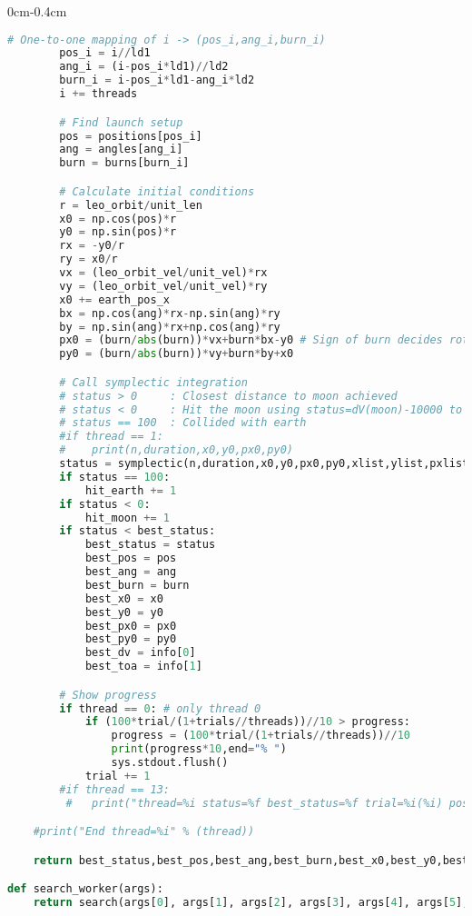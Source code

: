 \begin{adjustwidth*}{0cm}{-0.4cm}
\begin{lstlisting}[language=Python]
        # One-to-one mapping of i -> (pos_i,ang_i,burn_i)
        pos_i = i//ld1
        ang_i = (i-pos_i*ld1)//ld2
        burn_i = i-pos_i*ld1-ang_i*ld2
        i += threads

        # Find launch setup
        pos = positions[pos_i]
        ang = angles[ang_i]
        burn = burns[burn_i]

        # Calculate initial conditions
        r = leo_orbit/unit_len
        x0 = np.cos(pos)*r
        y0 = np.sin(pos)*r
        rx = -y0/r
        ry = x0/r
        vx = (leo_orbit_vel/unit_vel)*rx
        vy = (leo_orbit_vel/unit_vel)*ry
        x0 += earth_pos_x
        bx = np.cos(ang)*rx-np.sin(ang)*ry
        by = np.sin(ang)*rx+np.cos(ang)*ry
        px0 = (burn/abs(burn))*vx+burn*bx-y0 # Sign of burn decides rotational direction of launch
        py0 = (burn/abs(burn))*vy+burn*by+x0

        # Call symplectic integration
        # status > 0     : Closest distance to moon achieved 
        # status < 0     : Hit the moon using status=dV(moon)-10000 to get into orbit
        # status == 100  : Collided with earth
        #if thread == 1:
        #    print(n,duration,x0,y0,px0,py0)
        status = symplectic(n,duration,x0,y0,px0,py0,xlist,ylist,pxlist,pylist,errlist,hlist,info)
        if status == 100:
            hit_earth += 1
        if status < 0:
            hit_moon += 1
        if status < best_status:
            best_status = status
            best_pos = pos
            best_ang = ang
            best_burn = burn
            best_x0 = x0
            best_y0 = y0
            best_px0 = px0
            best_py0 = py0
            best_dv = info[0]
            best_toa = info[1]

        # Show progress
        if thread == 0: # only thread 0
            if (100*trial/(1+trials//threads))//10 > progress:
                progress = (100*trial/(1+trials//threads))//10
                print(progress*10,end="% ")
                sys.stdout.flush()
            trial += 1
        #if thread == 13:
         #   print("thread=%i status=%f best_status=%f trial=%i(%i) pos=%f ang=%f burn=%f" % (thread,status,best_status,trial,trials,pos,ang,burn))

    #print("End thread=%i" % (thread))

    return best_status,best_pos,best_ang,best_burn,best_x0,best_y0,best_px0,best_py0,best_dv,best_toa,hit_earth,hit_moon

def search_worker(args):
    return search(args[0], args[1], args[2], args[3], args[4], args[5], args[6])


\end{lstlisting}
\end{adjustwidth*}
